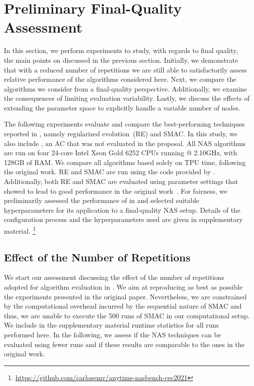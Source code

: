 \section{Preliminary Final-Quality Assessment}
\label{sec:results}
In this section, we perform experiments to study, with regards to final quality, the main points on \nasbench discussed in the previous section. Initially, we demonstrate that with a reduced number of repetitions we are still able to satisfactorily assess relative performance of the algorithms considered here. Next, we compare the algorithms we consider from a final-quality perspective. Additionally, we examine the consequences of limiting evaluation variability. Lastly, we discuss the effects of extending the parameter space to explicitly handle a variable number of nodes.

The following experiments evaluate and compare the best-performing techniques reported in \nasbench, namely regularized evolution~(RE) and SMAC. In this study, we also include \irace, an AC that was not evaluated in the  \nasbench proposal. All NAS algorithms are run on four 24-core Intel Xeon Gold 6252 CPUs running @ 2.10GHz, with 128GB of RAM. We compare all algorithms based solely on TPU time, following the original work. 
RE and SMAC are run using the code  provided by \nasbench. Additionally, both RE and SMAC are evaluated using parameter settings that showed to lead to good performance in the original \nasbench work~\cite{YinKleChrReaMurHut2019nasbench}. For fairness, we preliminarily assessed the performance of \irace in \nasbench and selected suitable hyperparameters for its application to a final-quality NAS setup. Details of the configuration process and the hyperparameters used are given in supplementary material.%
\footnote{\url{https://github.com/carlosemv/anytime-nasbench-cec2021}}

\subsection{Effect of the Number of Repetitions}

We start our assessment discussing the effect of the number of repetitions adopted for algorithm evaluation in \nasbench. We aim at reproducing as best as possible the experiments presented in the original \nasbench paper. Nevertheless, we are constrained by the computational overhead incurred by the sequential nature of SMAC and thus, we are unable to execute the 500 runs of SMAC in our computational setup. We include in the supplementary material runtime statistics for all runs performed here. In the following, we assess if the NAS techniques can be evaluated using fewer runs and if these results are comparable to the ones in the original \nasbench work.


